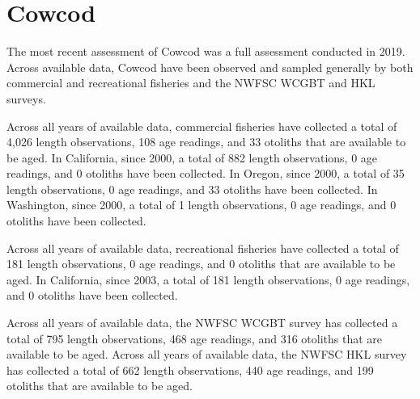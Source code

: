 \documentclass[11pt,
  english,
  letterpaper,
]{article}
\begin{document}

\hypertarget{cowcod}{%
\section{Cowcod}\label{cowcod}}

\leavevmode\tagmcend\tagstructend


The most recent assessment of Cowcod was a full assessment conducted in 2019. Across available data, Cowcod have been observed and sampled generally by both commercial and recreational fisheries and the NWFSC WCGBT and HKL surveys.

\leavevmode\tagmcend\tagstructend\par


Across all years of available data, commercial fisheries have collected a total of 4,026 length observations, 108 age readings, and 33 otoliths that are available to be aged. In California, since 2000, a total of 882 length observations, 0 age readings, and 0 otoliths have been collected. In Oregon, since 2000, a total of 35 length observations, 0 age readings, and 33 otoliths have been collected. In Washington, since 2000, a total of 1 length observations, 0 age readings, and 0 otoliths have been collected.

\leavevmode\tagmcend\tagstructend\par


Across all years of available data, recreational fisheries have collected a total of 181 length observations, 0 age readings, and 0 otoliths that are available to be aged. In California, since 2003, a total of 181 length observations, 0 age readings, and 0 otoliths have been collected.

\leavevmode\tagmcend\tagstructend\par


Across all years of available data, the NWFSC WCGBT survey has collected a total of 795 length observations, 468 age readings, and 316 otoliths that are available to be aged. Across all years of available data, the NWFSC HKL survey has collected a total of 662 length observations, 440 age readings, and 199 otoliths that are available to be aged.
\end{document}
